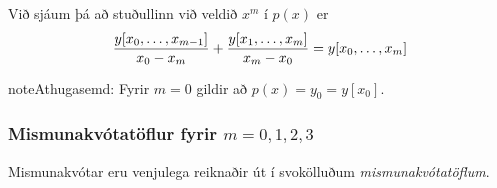 \documentclass[a4paper,10pt,icelandic]{sphinxmanual}
\begin{document}
Við sjáum þá að stuðullinn við veldið \(x^m\) í \(p(x)\) er
\begin{gather}
\begin{split}\frac{y[x_0, \ldots, x_{m-1}]}{x_0-x_m} +
  \frac{y[x_1, \ldots, x_m]}{x_m - x_0}
  = y[x_0, \ldots, x_m]\end{split}\notag
\end{gather}
\begin{notice}{note}{Athugasemd:}
Fyrir \(m=0\) gildir að \(p(x) = y_0 = y[x_0]\).
\end{notice}


\subsubsection{Mismunakvótatöflur fyrir \(m=0,1,2,3\)}
\label{kafli03:mismunakvotatoflur-fyrir}\label{kafli03:index-10}
Mismunakvótar eru venjulega reiknaðir út í svokölluðum
\emph{mismunakvótatöflum}.
\end{document}
